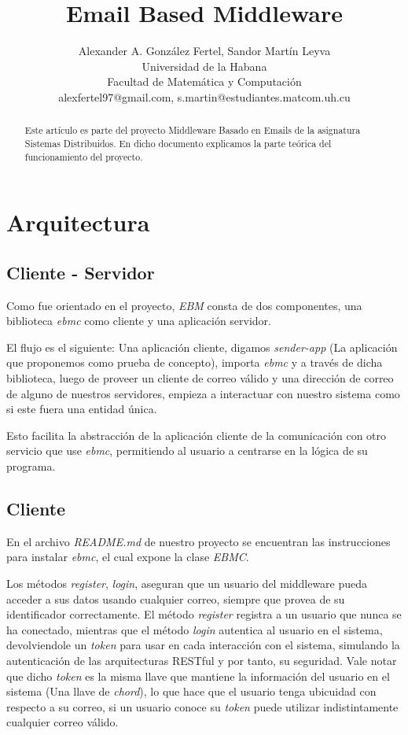 \documentclass[a4paper]{article}
\title{Email Based Middleware}
\author{Alexander A. González Fertel, Sandor Martín Leyva\\
  \small Universidad de la Habana\\
  \small Facultad de Matemática y Computación\\
  \small alexfertel97@gmail.com, s.martin@estudiantes.matcom.uh.cu
  \date{}
}
\begin{document}
\maketitle

\begin{abstract}
	
Este artículo es parte del proyecto Middleware Basado en Emails de la asignatura Sistemas Distribuidos.
En dicho documento explicamos la parte teórica del funcionamiento del proyecto.

\end{abstract}

\section{Arquitectura}\label{sec:arquitectura}
	\subsection{Cliente - Servidor}\label{subsec:cliente---servidor}
	Como fue orientado en el proyecto, \emph{EBM} consta de dos componentes, una biblioteca \emph{ebmc} como cliente y una aplicación servidor.
	
	El flujo es el siguiente: Una aplicación cliente, digamos \emph{sender-app} (La aplicación que proponemos como prueba de concepto), importa \emph{ebmc} y a través de dicha biblioteca, luego de proveer un cliente de correo válido y una dirección de correo de alguno de nuestros servidores, empieza a interactuar con nuestro sistema como si este fuera una entidad única.
	
	Esto facilita la abstracción de la aplicación cliente de la comunicación con otro servicio que use \emph{ebmc}, permitiendo al usuario a centrarse en la lógica de su programa.
	
	\subsection{Cliente}\label{subsec:cliente}
	En el archivo \emph{README.md} de nuestro proyecto se encuentran las instrucciones para instalar \emph{ebmc}, el cual expone la clase \emph{EBMC}.
	
	Los métodos \emph{register}, \emph{login}, aseguran que un usuario del middleware pueda acceder a sus datos usando cualquier correo, siempre que provea de su identificador correctamente.
	El método \emph{register} registra a un usuario que nunca se ha conectado, mientras que el método \emph{login} autentica al usuario en el sistema, devolviendole un \emph{token} para usar en cada interacción con el sistema, simulando la autenticación de las arquitecturas RESTful y por tanto, su seguridad.
	Vale notar que dicho \emph{token} es la misma llave que mantiene la información del usuario en el sistema (Una llave de \emph{chord}), lo que hace que el usuario tenga ubicuidad con respecto a su correo, si un usuario conoce su \emph{token} puede utilizar indistintamente cualquier correo válido.
	
\end{document}
